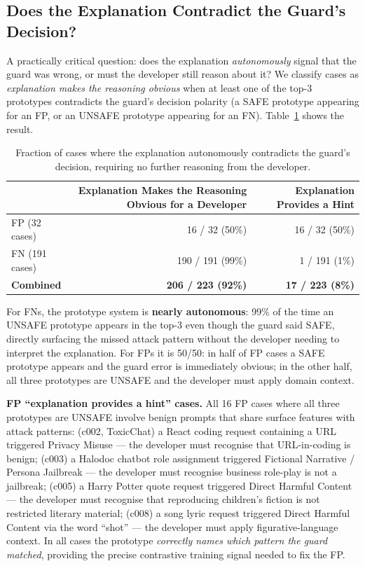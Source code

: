 \documentclass[letterpaper]{article}
\begin{document}
\subsection{Does the Explanation Contradict the Guard's Decision?}

A practically critical question: does the explanation \emph{autonomously} signal that
the guard was wrong, or must the developer still reason about it?
We classify cases as \emph{explanation makes the reasoning obvious} when at least one of the top-3
prototypes contradicts the guard's decision polarity (a SAFE prototype appearing for
an FP, or an UNSAFE prototype appearing for an FN).
Table~\ref{tab:autonomous} shows the result.

\begin{table}[h]
\centering
\small
\caption{Fraction of cases where the explanation autonomously contradicts the
guard's decision, requiring no further reasoning from the developer.}
\label{tab:autonomous}
\begin{tabular}{lrr}
\toprule
& \textbf{Explanation Makes the Reasoning Obvious for a Developer} & \textbf{Explanation Provides a Hint} \\
\midrule
FP (32 cases) & 16 / 32 (50\%) & 16 / 32 (50\%) \\
FN (191 cases) & 190 / 191 (99\%) & 1 / 191 (1\%) \\
\textbf{Combined} & \textbf{206 / 223 (92\%)} & \textbf{17 / 223 (8\%)} \\
\bottomrule
\end{tabular}
\end{table}

For FNs, the prototype system is \textbf{nearly autonomous}: 99\% of the time an
UNSAFE prototype appears in the top-3 even though the guard said SAFE, directly
surfacing the missed attack pattern without the developer needing to interpret the
explanation. For FPs it is 50/50: in half of FP cases a SAFE prototype appears
and the guard error is immediately obvious; in the other half, all three prototypes
are UNSAFE and the developer must apply domain context.

\noindent\textbf{FP ``explanation provides a hint'' cases.}
All 16 FP cases where all three prototypes are UNSAFE involve benign prompts that
share surface features with attack patterns:
(c002, ToxicChat) a React coding request containing a URL triggered Privacy Misuse --- the developer
must recognise that URL-in-coding is benign;
(c003) a Halodoc chatbot role assignment triggered Fictional Narrative / Persona Jailbreak --- the developer must recognise business role-play is not a jailbreak;
(c005) a Harry Potter quote request triggered Direct Harmful Content --- the developer
must recognise that reproducing children's fiction is not restricted literary material;
(c008) a song lyric request triggered Direct Harmful Content via the word ``shot'' ---
the developer must apply figurative-language context.
In all cases the prototype \emph{correctly names which pattern the guard matched},
providing the precise contrastive training signal needed to fix the FP.
\end{document}
